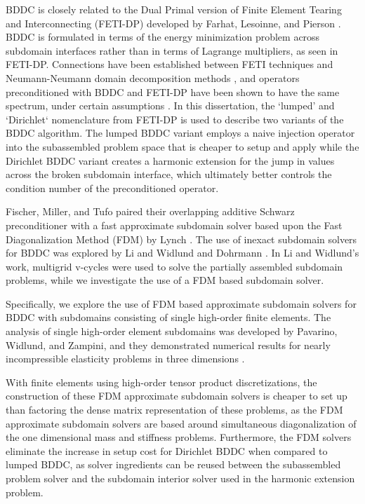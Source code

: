BDDC is closely related to the Dual Primal version of Finite Element Tearing and Interconnecting (FETI-DP) developed by Farhat, Lesoinne, and Pierson \cite{farhat1991method}.
BDDC is formulated in terms of the energy minimization problem across subdomain interfaces rather than in terms of Lagrange multipliers, as seen in FETI-DP.
Connections have been established between FETI techniques and Neumann-Neumann domain decomposition methods \cite{klawonn2001feti}, and operators preconditioned with BDDC and FETI-DP have been shown to have the same spectrum, under certain assumptions \cite{mandel2007bddc}.
In this dissertation, the `lumped' and `Dirichlet` nomenclature from FETI-DP is used to describe two variants of the BDDC algorithm.
The lumped BDDC variant employs a naive injection operator into the subassembled problem space that is cheaper to setup and apply while the Dirichlet BDDC variant creates a harmonic extension for the jump in values across the broken subdomain interface, which ultimately better controls the condition number of the preconditioned operator.

Fischer, Miller, and Tufo \cite{fischer2000overlapping} paired their overlapping additive Schwarz preconditioner with a fast approximate subdomain solver based upon the Fast Diagonalization Method (FDM) by Lynch \cite{lynch1964direct}.
The use of inexact subdomain solvers for BDDC was explored by Li and Widlund \cite{li2007use} and Dohrmann \cite{dohrmann2007approximate}.
In Li and Widlund's work, multigrid v-cycles were used to solve the partially assembled subdomain problems, while we investigate the use of a FDM based subdomain solver.

Specifically, we explore the use of FDM based approximate subdomain solvers for BDDC with subdomains consisting of single high-order finite elements.
The analysis of single high-order element subdomains was developed by Pavarino, Widlund, and Zampini, and they demonstrated numerical results for nearly incompressible elasticity problems in three dimensions \cite{pavarino2010bddc}.

With finite elements using high-order tensor product discretizations, the construction of these FDM approximate subdomain solvers is cheaper to set up than factoring the dense matrix representation of these problems, as the FDM approximate subdomain solvers are based around simultaneous diagonalization of the one dimensional mass and stiffness problems.
Furthermore, the FDM solvers eliminate the increase in setup cost for Dirichlet BDDC when compared to lumped BDDC, as solver ingredients can be reused between the subassembled problem solver and the subdomain interior solver used in the harmonic extension problem.

